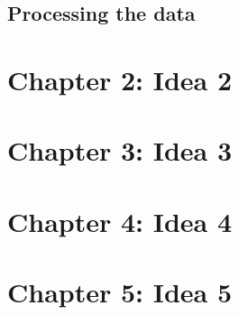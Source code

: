 \documentclass{article}
\begin{document}
\subsection{Processing the data}
\section{Chapter 2: Idea 2}
\section{Chapter 3: Idea 3}
\section{Chapter 4: Idea 4}
\section{Chapter 5: Idea 5}

\newpage
\begin{flushleft}
    
\end{flushleft}
\end{document}
